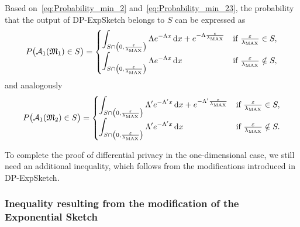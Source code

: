 Based on~\eqref{eq:Probability_min_2} and~\eqref{eq:Probability_min_23}, the probability that the output of DP-ExpSketch belongs to $S$ can be expressed as
\begin{equation}
\label{eq:probability}
P\bigl(\mathcal{A}_1(\mathfrak{M}_1) \in S \bigr) =
\begin{cases}
  \displaystyle\int_{S \cap \left(0, \frac{\varepsilon}{\lambda_{\mathrm{MAX}}}\right)} \Lambda e^{-\Lambda x} \,\mathrm{d} x + e^{-\Lambda\frac{\varepsilon}{\lambda_{\mathrm{MAX}}}} & \text{if } \frac{\varepsilon}{\lambda_{\mathrm{MAX}}} \in S, \\[2ex]
  \displaystyle\int_{S \cap \left(0, \frac{\varepsilon}{\lambda_{\mathrm{MAX}}}\right)} \Lambda e^{-\Lambda x} \,\mathrm{d} x & \text{if } \frac{\varepsilon}{\lambda_{\mathrm{MAX}}} \notin S,
\end{cases}
\end{equation}
and analogously
\begin{equation}
\label{eq:probability2}
P\bigl(\mathcal{A}_1(\mathfrak{M}_2) \in S \bigr) =
\begin{cases}
  \displaystyle\int_{S \cap \left(0, \frac{\varepsilon}{\lambda_{\mathrm{MAX}}}\right)} \Lambda' e^{-\Lambda' x} \,\mathrm{d} x + e^{-\Lambda'\frac{\varepsilon}{\lambda_{\mathrm{MAX}}}} & \text{if } \frac{\varepsilon}{\lambda_{\mathrm{MAX}}} \in S, \\[2ex]
  \displaystyle\int_{S \cap \left(0, \frac{\varepsilon}{\lambda_{\mathrm{MAX}}}\right)} \Lambda' e^{-\Lambda' x} \,\mathrm{d} x & \text{if } \frac{\varepsilon}{\lambda_{\mathrm{MAX}}} \notin S.
\end{cases}
\end{equation}

To complete the proof of differential privacy in the one-dimensional case, we still need an additional inequality, which follows from the modifications introduced in DP-ExpSketch.

\subsubsection{Inequality resulting from the modification of the Exponential Sketch}
\label{sssec:delta2}


